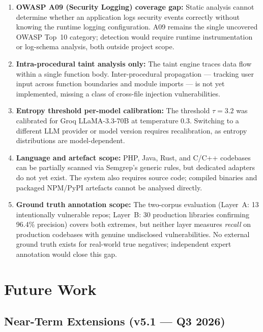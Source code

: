 \begin{enumerate}
  \item \textbf{OWASP A09 (Security Logging) coverage gap:} Static analysis cannot determine whether an application logs security events correctly without knowing the runtime logging configuration. A09 remains the single uncovered OWASP Top~10 category; detection would require runtime instrumentation or log-schema analysis, both outside project scope.

  \item \textbf{Intra-procedural taint analysis only:} The taint engine traces data flow within a single function body. Inter-procedural propagation --- tracking user input across function boundaries and module imports --- is not yet implemented, missing a class of cross-file injection vulnerabilities.

  \item \textbf{Entropy threshold per-model calibration:} The threshold $\tau = 3.2$ was calibrated for Groq LLaMA-3.3-70B at temperature 0.3. Switching to a different LLM provider or model version requires recalibration, as entropy distributions are model-dependent.

  \item \textbf{Language and artefact scope:} PHP, Java, Rust, and C/C++ codebases can be partially scanned via Semgrep's generic rules, but dedicated adapters do not yet exist. The system also requires source code; compiled binaries and packaged NPM/PyPI artefacts cannot be analysed directly.

  \item \textbf{Ground truth annotation scope:} The two-corpus evaluation (Layer~A: 13 intentionally vulnerable repos; Layer~B: 30 production libraries confirming 96.4\% precision) covers both extremes, but neither layer measures \emph{recall} on production codebases with genuine undisclosed vulnerabilities. No external ground truth exists for real-world true negatives; independent expert annotation would close this gap.
\end{enumerate}

\section{Future Work}
\label{sec:future}

\subsection{Near-Term Extensions (v5.1 --- Q3 2026)}

